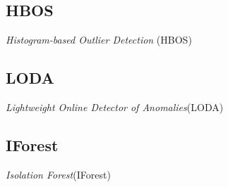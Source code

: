 \subsection{HBOS}
\textit{Histogram-based Outlier Detection} (HBOS) \cite{hbos}

\subsection{LODA}
\textit{Lightweight Online Detector of Anomalies}(LODA) \cite{loda}

\subsection{IForest}
\textit{Isolation Forest}(IForest) \cite{iforest}
\label{sub:IF}
